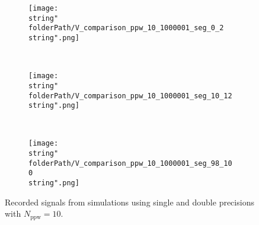 
\renewcommand{\folderPath}{\string"./fig/1D_example/comparison/output_dt_1p000000000000000e-04/single_double/\string"}


\hspace{-0.05\textwidth}
\begin{minipage}[t]{.5\textwidth}
%
\begin{figure}[H]
\captionsetup{width=0.95\textwidth,font=footnotesize,labelfont=footnotesize}
\centering
%
\begin{subfigure}[b]{1\textwidth}
%
\centering\texttt{[image: \\string"\\folderPath/V\_comparison\_ppw\_10\_1000001\_seg\_0\_2\\string".png]}
%
\end{subfigure}\hfill
\\[2ex]
%
\begin{subfigure}[b]{1\textwidth}
%
\centering\texttt{[image: \\string"\\folderPath/V\_comparison\_ppw\_10\_1000001\_seg\_10\_12\\string".png]}
%
\end{subfigure}\hfill
\\[2ex]
%
\begin{subfigure}[b]{1\textwidth}
%
\centering\texttt{[image: \\string"\\folderPath/V\_comparison\_ppw\_10\_1000001\_seg\_98\_100\\string".png]}
%
\end{subfigure}\hfill
%
\caption{Recorded signals from simulations using single and double precisions with $N_\text{ppw}=10$.}
\label{comparison_V_single_double_segments_ppw_10}
\end{figure}
%
\end{minipage}
%
\hfill %
%
